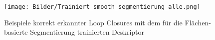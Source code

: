 \begin{figure}
	\centering
	\texttt{[image: Bilder/Trainiert\_smooth\_segmentierung\_alle.png]}
	\caption{Beispiele korrekt erkannter Loop Closures mit dem für die Flächen-basierte Segmentierung trainierten Deskriptor }
	\label{fig:PR_smooth_bb}
\end{figure}


